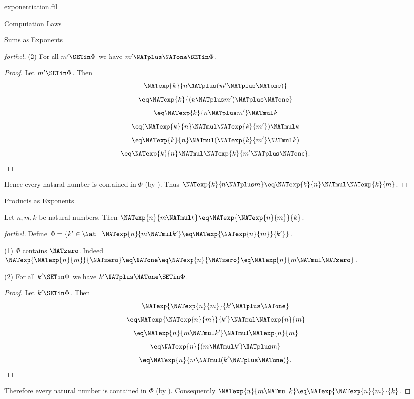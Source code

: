 \documentclass{stex}
\begin{document}
\begin{smodule}{exponentiation.ftl}
\begin{sfragment}{Computation Laws}
\begin{sfragment}{Sums as Exponents}
\begin{proof}[forthel]
      (2) For all $m' \SETin \Phi$ we have $m' \NATplus \NATone \SETin \Phi$.
      \begin{proof}
        Let $m' \SETin \Phi$.
        Then
        \[  \NATexp{k}{n \NATplus (m' \NATplus \NATone)}                  \]
        \[    \eq \NATexp{k}{(n \NATplus m') \NATplus \NATone}              \]
        \[    \eq \NATexp{k}{n \NATplus m'} \NATmul k            \]
        \[    \eq (\NATexp{k}{n} \NATmul \NATexp{k}{m'}) \NATmul k  \]
        \[    \eq \NATexp{k}{n} \NATmul (\NATexp{k}{m'} \NATmul k)  \]
        \[    \eq \NATexp{k}{n} \NATmul \NATexp{k}{m' \NATplus \NATone}.       \]
      \end{proof}

      Hence every natural number is contained in $\Phi$ (by ).
      Thus $\NATexp{k}{n \NATplus m} \eq \NATexp{k}{n} \NATmul \NATexp{k}{m}$.
    \end{proof}
  \end{sfragment}

  \begin{sfragment}{Products as Exponents}
    \begin{proposition}[forthel,id=ARITHMETIC_09_7827956571308032]
      Let $n, m, k$ be natural numbers.
      Then $\NATexp{n}{m \NATmul k} \eq \NATexp{\NATexp{n}{m}}{k}$.
    \end{proposition}
    \begin{proof}[forthel]
      Define $\Phi = \{ k' \in \Nat \mid \NATexp{n}{m \NATmul k'} \eq \NATexp{\NATexp{n}{m}}{k'} \}$.

      (1) $\Phi$ contains $\NATzero$.
      Indeed $\NATexp{\NATexp{n}{m}}{\NATzero}
        \eq \NATone
        \eq \NATexp{n}{\NATzero}
        \eq \NATexp{n}{m \NATmul \NATzero}$.

      (2) For all $k' \SETin \Phi$ we have $k' \NATplus \NATone \SETin \Phi$.
      \begin{proof}
        Let $k' \SETin \Phi$.
        Then
        \[  \NATexp{\NATexp{n}{m}}{k' \NATplus \NATone}                \]
        \[    \eq \NATexp{\NATexp{n}{m}}{k'} \NATmul \NATexp{n}{m}    \]
        \[    \eq \NATexp{n}{m \NATmul k'} \NATmul \NATexp{n}{m}  \]
        \[    \eq \NATexp{n}{(m \NATmul k') \NATplus m}        \]
        \[    \eq \NATexp{n}{m \NATmul (k' \NATplus \NATone)}.       \]
      \end{proof}

      Therefore every natural number is contained in $\Phi$ (by ).
      Consequently $\NATexp{n}{m \NATmul k} \eq \NATexp{\NATexp{n}{m}}{k}$.
    \end{proof}
  \end{sfragment}


\end{sfragment}
\end{smodule}
\end{document}
